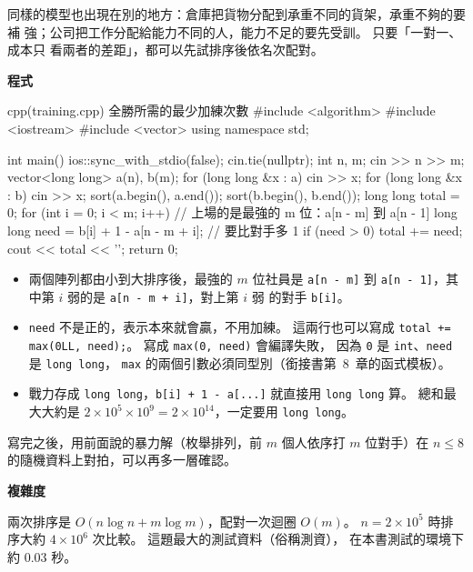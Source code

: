 同樣的模型也出現在別的地方：倉庫把貨物分配到承重不同的貨架，承重不夠的要補
強；公司把工作分配給能力不同的人，能力不足的要先受訓。 只要「一對一、成本只
看兩者的差距」，都可以先試排序後依名次配對。

\textbf{程式}

\begin{example}[label=ex:training]{cpp}{(training.cpp) 全勝所需的最少加練次數}
#include <algorithm>
#include <iostream>
#include <vector>
using namespace std;

int main() {
    ios::sync_with_stdio(false);
    cin.tie(nullptr);
    int n, m;
    cin >> n >> m;
    vector<long long> a(n), b(m);
    for (long long &x : a) {
        cin >> x;
    }
    for (long long &x : b) {
        cin >> x;
    }
    sort(a.begin(), a.end());
    sort(b.begin(), b.end());
    long long total = 0;
    for (int i = 0; i < m; i++) {
        // 上場的是最強的 m 位：a[n - m] 到 a[n - 1]
        long long need = b[i] + 1 - a[n - m + i];   // 要比對手多 1
        if (need > 0) {
            total += need;
        }
    }
    cout << total << '\n';
    return 0;
}
\end{example}


\begin{itemize}
\item 兩個陣列都由小到大排序後，最強的 $m$ 位社員是 \texttt{a[n - m]} 到
\texttt{a[n - 1]}，其中第 $i$ 弱的是 \texttt{a[n - m + i]}，對上第 $i$ 弱
的對手 \texttt{b[i]}。
\item \texttt{need} 不是正的，表示本來就會贏，不用加練。 這兩行也可以寫成
\texttt{total += max(0LL, need);}。 寫成 \texttt{max(0, need)} 會編譯失敗，
因為 \texttt{0} 是 \texttt{int}、\texttt{need} 是 \texttt{long long}，
\texttt{max} 的兩個引數必須同型別（銜接書第~8~章的函式模板）。
\item 戰力存成 \texttt{long long}，\texttt{b[i] + 1 - a[...]} 就直接用
\texttt{long long} 算。 總和最大大約是 $2 \times 10^5 \times 10^9 =
2 \times 10^{14}$，一定要用 \texttt{long long}。
\end{itemize}

寫完之後，用前面說的暴力解（枚舉排列，前 $m$ 個人依序打 $m$ 位對手）在
$n \le 8$ 的隨機資料上對拍，可以再多一層確認。

\textbf{複雜度}

兩次排序是 $O(n \log n + m \log m)$，配對一次迴圈 $O(m)$。 $n = 2 \times
10^5$ 時排序大約 $4 \times 10^6$ 次比較。 這題最大的測試資料（俗稱測資），
在本書測試的環境下約 $0.03$ 秒。

